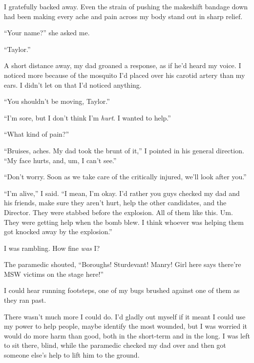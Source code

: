 I gratefully backed away.  Even the strain of pushing the makeshift bandage down had been making every ache and pain across my body stand out in sharp relief.



``Your name?'' she asked me.



``Taylor.''



A short distance away, my dad groaned a response, as if he'd heard my voice.  I noticed more because of the mosquito I'd placed over his carotid artery than my ears.  I didn't let on that I'd noticed anything.



``You shouldn't be moving, Taylor.''



``I'm sore, but I don't think I'm \emph{hurt}.  I wanted to help.''



``What kind of pain?''



``Bruises, aches.  My dad took the brunt of it,'' I pointed in his general direction.  ``My face hurts, and, um, I can't see.''



``Don't worry.  Soon as we take care of the critically injured, we'll look after you.''



``I'm alive,'' I said.  ``I mean, I'm okay.  I'd rather you guys checked my dad and his friends, make sure they aren't hurt, help the other candidates, and the Director.  They were stabbed before the explosion.  All of them like this.  Um.  They were getting help when the bomb blew.  I think whoever was helping them got knocked away by the explosion.''



I was rambling.  How fine \emph{was} I?



The paramedic shouted, ``Boroughs!  Sturdevant!  Manry!  Girl here says there're MSW victims on the stage here!''



I could hear running footsteps, one of my bugs brushed against one of them as they ran past.



There wasn't much more I could do.  I'd gladly out myself if it meant I could use my power to help people, maybe identify the most wounded, but I was worried it would do more harm than good, both in the short-term and in the long.  I was left to sit there, blind, while the paramedic checked my dad over and then got someone else's help to lift him to the ground.




